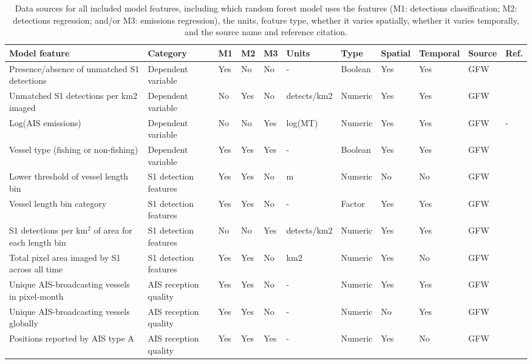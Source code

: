 \begin{table}[!h]
\centering
\caption{\label{tab:data_sources}Data sources for all included model features, including which random forest model uses the features (M1: detections classification; M2: detections regression; and/or M3: emissions regression), the units, feature type, whether it varies spatially, whether it varies temporally, and the source name and reference citation.}
\centering
\fontsize{4}{6}\selectfont
\setlength{\tabcolsep}{2pt}
\begin{tabular}[t]{lllllllllll}
\toprule
Model feature & Category & M1 & M2 & M3 & Units & Type & Spatial & Temporal & Source & Ref.\\
\midrule
Presence/absence of unmatched S1 detections & Dependent variable & Yes & No & No & - & Boolean & Yes & Yes & GFW & \cite{paolo2024satellite}\\
Unmatched S1 detections per km2 imaged & Dependent variable & No & Yes & No & detects/km2 & Numeric & Yes & Yes & GFW & \cite{paolo2024satellite}\\
Log(AIS emissions) & Dependent variable & No & No & Yes & log(MT) & Numeric & Yes & Yes & GFW & -\\
Vessel type (fishing or non-fishing) & Dependent variable & Yes & Yes & Yes & - & Boolean & Yes & Yes & GFW & \cite{paolo2024satellite}\\
Lower threshold of vessel length bin & S1 detection features & Yes & Yes & No & m & Numeric & No & No & GFW & \cite{paolo2024satellite}\\
\addlinespace
Vessel length bin category & S1 detection features & Yes & Yes & No & - & Factor & Yes & Yes & GFW & \cite{paolo2024satellite}\\
S1 detections per km$^2$ of area for each length bin & S1 detection features & No & No & Yes & detects/km2 & Numeric & Yes & Yes & GFW & \cite{paolo2024satellite}\\
Total pixel area imaged by S1 across all time & S1 detection features & Yes & Yes & No & km2 & Numeric & Yes & No & GFW & \cite{paolo2024satellite}\\
Unique AIS-broadcasting vessels in pixel-month & AIS reception quality & Yes & Yes & No & - & Numeric & Yes & Yes & GFW & \cite{kroodsma2018tracking}\\
Unique AIS-broadcasting vessels globally & AIS reception quality & Yes & Yes & No & - & Numeric & No & Yes & GFW & \cite{kroodsma2018tracking}\\
\addlinespace
Positions reported by AIS type A & AIS reception quality & Yes & Yes & Yes & - & Numeric & Yes & No & GFW & \cite{kroodsma2018tracking}\\

\end{tabular}
\end{table}

